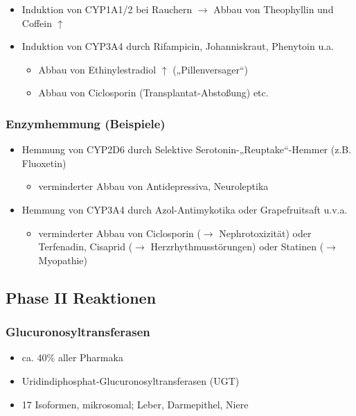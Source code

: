 \documentclass[10pt,a4paper]{report}
\begin{document}
\begin{itemize}
	\item Induktion von CYP1A1/2 bei Rauchern $\rightarrow$ Abbau von Theophyllin und Coffein $\uparrow$
	\item Induktion von CYP3A4 durch Rifampicin, Johanniskraut, Phenytoin u.a. 
	\begin{itemize}
 		\item Abbau von Ethinylestradiol $\uparrow$ („Pillenversager“)
 		\item Abbau von Ciclosporin (Transplantat-Abstoßung) etc.
	\end{itemize}
\end{itemize}

\subsubsection{Enzymhemmung (Beispiele)}

\begin{itemize}
	\item Hemmung von CYP2D6 durch Selektive Serotonin-„Reuptake“-Hemmer (z.B. Fluoxetin)
	\begin{itemize}
			\item verminderter	 Abbau von Antidepressiva, Neuroleptika
	\end{itemize}
	\item Hemmung von CYP3A4 durch Azol-Antimykotika oder Grapefruitsaft u.v.a.
	\begin{itemize}
			\item verminderter Abbau von Ciclosporin ($\rightarrow$ Nephrotoxizität) oder Terfenadin, Cisaprid ($\rightarrow$ Herzrhythmusstörungen) oder Statinen ($\rightarrow$ Myopathie)
	\end{itemize}
\end{itemize}

\subsection{Phase II Reaktionen} 

\subsubsection{Glucuronosyltransferasen}

\begin{itemize}
	\item ca. 40\% aller Pharmaka
	\item Uridindiphosphat-Glucuronosyltransferasen (UGT)
	\item 17 Isoformen, mikrosomal; Leber, Darmepithel, Niere
\end{itemize}
\end{document}
